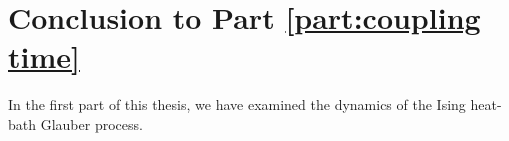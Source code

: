\chapter{Conclusion to Part \ref{part:coupling time}}
\label{Ch:CouplingConclusion}


In the first part of this thesis, we have examined the dynamics of the Ising heat-bath Glauber process.